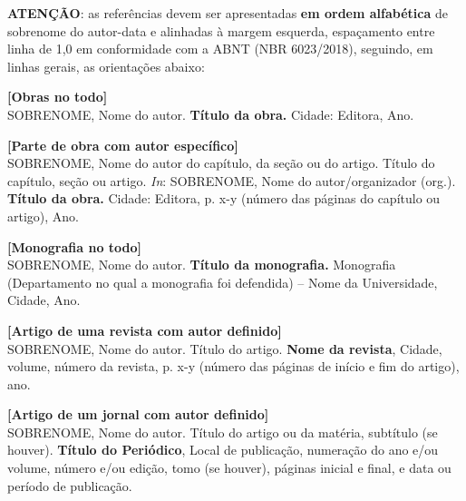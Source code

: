\bigskip

\medskip
\begingroup\singlespacing
\noindent\textcolor{docblue}{\textbf{ATENÇÃO}}: as referências devem ser apresentadas \textcolor{docblue}{\textbf{em ordem alfabética}} de sobrenome do autor-data e alinhadas à margem esquerda, espaçamento entre linha de 1,0 em conformidade com a ABNT (NBR 6023/2018), seguindo, em linhas gerais, as orientações abaixo:
\par

\bigskip
\noindent\textcolor{docblue}{\textbf{[Obras no todo]}}\\
SOBRENOME, Nome do autor. \textbf{Título da obra.} Cidade: Editora, Ano.

\bigskip
\noindent\textcolor{docblue}{\textbf{[Parte de obra com autor específico]}}\\
SOBRENOME, Nome do autor do capítulo, da seção ou do artigo. Título do capítulo, seção ou artigo. \textit{In}: SOBRENOME, Nome do autor/organizador (org.). \textbf{Título da obra.} Cidade: Editora, p. x-y (número das páginas do capítulo ou artigo), Ano.

\bigskip
\noindent\textcolor{docblue}{\textbf{[Monografia no todo]}}\\
SOBRENOME, Nome do autor. \textbf{Título da monografia.}  Monografia (Departamento no qual a monografia foi defendida) -- Nome da Universidade, Cidade, Ano.

\bigskip
\noindent\textcolor{docblue}{\textbf{[Artigo de uma revista com autor definido]}}\\
SOBRENOME, Nome do autor. Título do artigo. \textbf{Nome da revista}, Cidade, volume, número da revista, p. x-y (número das páginas de início e fim do artigo), ano.

\bigskip
\noindent\textcolor{docblue}{\textbf{[Artigo de um jornal com autor definido]}}\\
SOBRENOME, Nome do autor. Título do artigo ou da matéria, subtítulo (se houver). \textbf{Título do Periódico}, Local de publicação, numeração do ano e/ou volume, número e/ou edição, tomo (se houver), páginas inicial e final, e data ou período de publicação.

